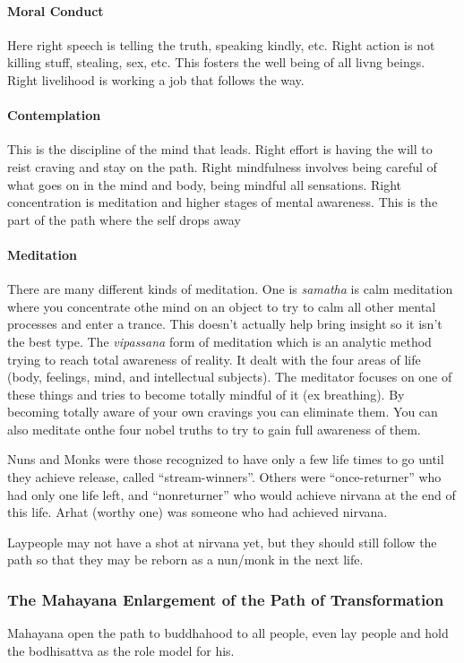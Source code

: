 \documentclass{article}
\begin{document}
\paragraph{Moral Conduct}
\label{par:paragraph_name}
Here right speech is telling the truth, speaking kindly, etc. Right action is not killing stuff, stealing, sex, etc. This fosters the well being of all livng beings. Right livelihood is working a job that follows the way.

\paragraph{Contemplation}
\label{par:contemplation}
This is the discipline of the mind that leads. Right effort is having the will to reist craving and stay on the path. Right mindfulness involves being careful of what goes on in the mind and body, being mindful all sensations. Right concentration is meditation and higher stages of mental awareness. This is the part of the path where the self drops away

\paragraph{Meditation}
\label{par:meditation}
There are many different kinds of meditation. One is \emph{samatha} is calm meditation where you concentrate othe mind on an object to try to calm all other mental processes and enter a trance. This doesn't actually help bring insight so it isn't the best type. The \emph{vipassana} form of meditation which is an analytic method trying to reach total awareness of reality. It dealt with the four areas of life (body, feelings, mind, and intellectual subjects). The meditator focuses on one of these things and tries to become totally mindful of it (ex breathing). By becoming totally aware of your own cravings you can eliminate them. You can also meditate onthe four nobel truths to try to gain full awareness of them.

Nuns and Monks were those recognized to have only a few life times to go until they achieve release, called ``stream-winners''. Others were ``once-returner'' who had only one life left, and ``nonreturner'' who would achieve nirvana at the end of this life. Arhat (worthy one) was someone who had achieved nirvana.

Laypeople may not have a shot at nirvana yet, but they should still follow the path so that they may be reborn as a nun/monk in the next life.

\subsubsection*{The Mahayana Enlargement of the Path of Transformation}
\label{ssub:mahayana_enlargement_of_the_path_of_transformation}
Mahayana open the path to buddhahood to all people, even lay people and hold the bodhisattva as the role model for his.
\end{document}

